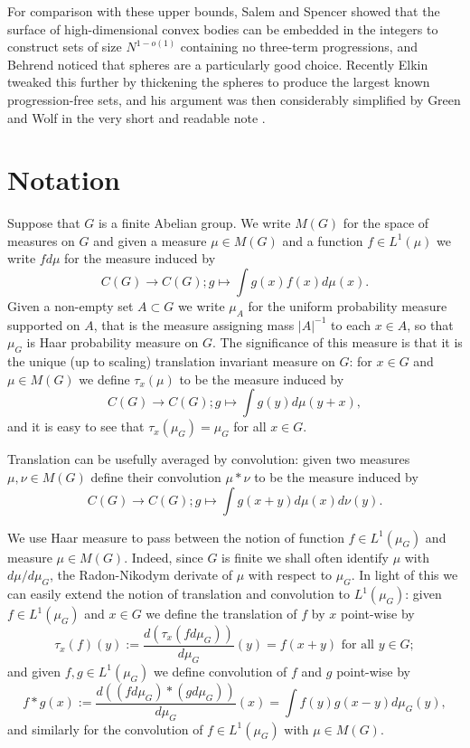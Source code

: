 \documentclass[12pt]{amsart}  %
\begin{document}
For comparison with these upper bounds, Salem and Spencer \cite{salspe::} showed that the surface of high-dimensional convex bodies can be embedded in the integers to construct sets of size $N^{1-o(1)}$ containing no three-term progressions, and Behrend \cite{beh::} noticed that spheres are a particularly good choice.  Recently Elkin \cite{elk::} tweaked this further by thickening the spheres to produce the largest known progression-free sets, and his argument was then considerably simplified by Green and Wolf in the very short and readable note \cite{grewol::}.

\section{Notation}

Suppose that $G$ is a finite Abelian group.  We write $M(G)$ for the space of measures on $G$ and given a measure $\mu \in M(G)$ and a function $f \in L^1(\mu)$ we write $fd\mu$ for the measure induced by 
\begin{equation*}
C(G) \rightarrow C(G); g \mapsto \int{g(x)f(x)d\mu(x)}.
\end{equation*}
Given a non-empty set $A \subset G$ we write $\mu_A$ for the uniform probability measure supported on $A$, that is the measure assigning mass $|A|^{-1}$ to each $x \in A$, so that $\mu_G$ is Haar probability measure on $G$.  The significance of this measure is that it is the unique (up to scaling) translation invariant measure on $G$: for $x \in G$ and $\mu \in M(G)$ we define $\tau_x(\mu)$ to be the measure induced by
\begin{equation*}
C(G) \rightarrow C(G); g \mapsto \int{g(y)d\mu(y+x)},
\end{equation*}
and it is easy to see that $\tau_x(\mu_G)=\mu_G$ for all $x \in G$. 

Translation can be usefully averaged by convolution: given two measures $\mu,\nu \in M(G)$ define their convolution $\mu \ast \nu$ to be the measure induced by
\begin{equation*}
C(G) \rightarrow C(G); g \mapsto \int{g(x+y)d\mu(x)d\nu(y)}.
\end{equation*}

We use Haar measure to pass between the notion of function $f\in L^1(\mu_G)$ and measure $\mu \in M(G)$.  Indeed, since $G$ is finite we shall often identify $\mu$ with $d\mu/d\mu_G$, the Radon-Nikodym derivate of $\mu$ with respect to $\mu_G$.  In light of this we can easily extend the notion of translation and convolution to $L^1(\mu_G)$: given $f \in L^1(\mu_G)$ and $x \in G$ we define the translation of $f$ by $x$ point-wise by
\begin{equation*}
\tau_x(f)(y):=\frac{d(\tau_x(fd\mu_G))}{d\mu_G}(y) = f(x+y) \textrm{ for all } y \in G;
\end{equation*}
and given $f,g \in L^1(\mu_G)$ we define convolution of $f$ and $g$ point-wise by
\begin{equation*}
f \ast g(x):=\frac{d((fd\mu_G) \ast (g d\mu_G))}{d\mu_G}(x) = \int{f(y)g(x-y)d\mu_G(y)},
\end{equation*}
and similarly for the convolution of $f \in L^1(\mu_G)$ with $\mu \in M(G)$. 
\end{document}

